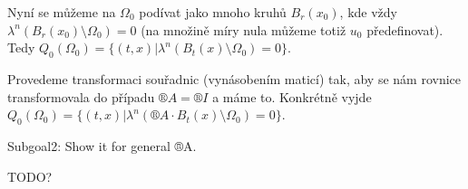 \documentclass[12pt]{article}					%
\begin{document}
\begin{priklad}
	\begin{reseni}[$\Omega_0$ obecné pro $®A = ®I$]
		Nyní se můžeme na $\Omega_0$ podívat jako mnoho kruhů $B_r(x_0)$, kde vždy $\lambda^n(B_r(x_0) \setminus \Omega_0) = 0$ (na množině míry nula můžeme totiž $u_0$ předefinovat). Tedy $Q_0(\Omega_0) = \{(t, x) | \lambda^n(B_t(x) \setminus \Omega_0) = 0\}$.
	\end{reseni}

	\begin{reseni}
		Provedeme transformaci souřadnic (vynásobením maticí) tak, aby se nám rovnice transformovala do případu $®A = ®I$ a máme to. Konkrétně vyjde $Q_0(\Omega_0) = \{(t, x) | \lambda^n(®A · B_t(x) \setminus \Omega_0) = 0\}$.
	\end{reseni}

	Subgoal2: Show it for general ®A.
	
	\begin{reseni}
		TODO?
	\end{reseni}
\end{priklad}
\end{document}
